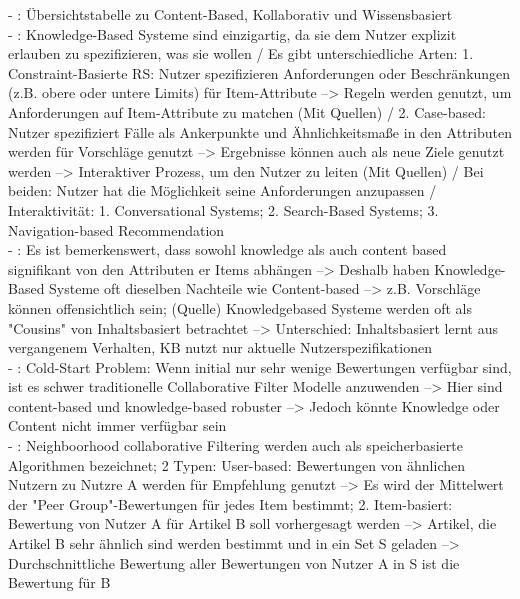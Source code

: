 - \cite[S. 16]{recommenderSystems:2016}: Übersichtstabelle zu Content-Based, Kollaborativ und Wissensbasiert \\
- \cite[S. 16f.]{recommenderSystems:2016}: Knowledge-Based Systeme sind einzigartig, da sie dem Nutzer explizit erlauben zu spezifizieren, was sie wollen / Es gibt unterschiedliche Arten: 1. Constraint-Basierte RS: Nutzer spezifizieren Anforderungen oder Beschränkungen (z.B. obere oder untere Limits) für Item-Attribute --> Regeln werden genutzt, um Anforderungen auf Item-Attribute zu matchen (Mit Quellen) / 2. Case-based: Nutzer spezifiziert Fälle als Ankerpunkte und Ähnlichkeitsmaße in den Attributen werden für Vorschläge genutzt --> Ergebnisse können auch als neue Ziele genutzt werden --> Interaktiver Prozess, um den Nutzer zu leiten (Mit Quellen) / Bei beiden: Nutzer hat die Möglichkeit seine Anforderungen anzupassen / Interaktivität: 1. Conversational Systems; 2. Search-Based Systems; 3. Navigation-based Recommendation\\
- \cite[S. 18]{recommenderSystems:2016}: Es ist bemerkenswert, dass sowohl knowledge als auch content based signifikant von den Attributen er Items abhängen --> Deshalb haben Knowledge-Based Systeme oft dieselben Nachteile wie Content-based --> z.B. Vorschläge können offensichtlich sein; (Quelle) Knowledgebased Systeme werden oft als "Cousins" von Inhaltsbasiert betrachtet --> Unterschied: Inhaltsbasiert lernt aus vergangenem Verhalten, KB nutzt nur aktuelle Nutzerspezifikationen \\
- \cite[S. 24]{recommenderSystems:2016}: Cold-Start Problem: Wenn initial nur sehr wenige Bewertungen verfügbar sind, ist es schwer traditionelle Collaborative Filter Modelle anzuwenden --> Hier sind content-based und knowledge-based robuster --> Jedoch könnte Knowledge oder Content nicht immer verfügbar sein\\
- \cite[S. 29]{recommenderSystems:2016}: Neighboorhood collaborative Filtering werden auch als speicherbasierte Algorithmen bezeichnet; 2 Typen: User-based: Bewertungen von ähnlichen Nutzern zu Nutzre A werden für Empfehlung genutzt --> Es wird der Mittelwert der "Peer Group"-Bewertungen für jedes Item bestimmt; 2. Item-basiert: Bewertung von Nutzer A für Artikel B soll vorhergesagt werden --> Artikel, die Artikel B sehr ähnlich sind werden bestimmt und in ein Set S geladen --> Durchschnittliche Bewertung aller Bewertungen von Nutzer A in S ist die Bewertung für B\\
